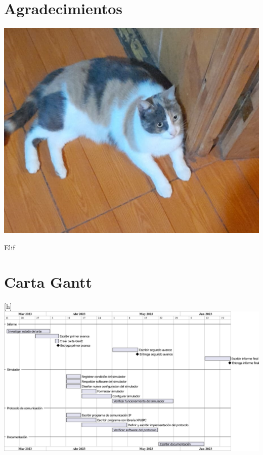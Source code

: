 \documentclass{report}
\begin{document}

\chapter*{Agradecimientos}
\begin{center}
	\includegraphics{elif.jpeg}
	
	Elif
\end{center}

\tableofcontents
\listoffigures



\printbibliography

\appendix
\chapter{Carta Gantt}
\begin{center}[h]
	\centering
	\includegraphics[width=\textwidth]{gantt}
\end{center}
\end{document}

